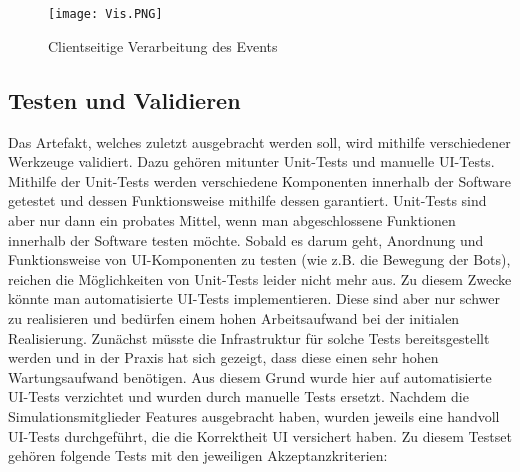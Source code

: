 \\\\  
\begin{figure}[h!]
	\centering
		\texttt{[image: Vis.PNG]}        
		\caption{Clientseitige Verarbeitung des Events}
	\label{addEventClient}
\end{figure} 
\newpage
\subsection{Testen und Validieren}
Das Artefakt, welches zuletzt ausgebracht werden soll, wird mithilfe verschiedener Werkzeuge validiert. Dazu gehören mitunter Unit-Tests und manuelle UI-Tests. Mithilfe der Unit-Tests werden verschiedene Komponenten innerhalb der Software getestet und dessen Funktionsweise mithilfe dessen garantiert. Unit-Tests sind aber nur dann ein probates Mittel, wenn man abgeschlossene Funktionen innerhalb der Software testen möchte. Sobald es darum geht, Anordnung und Funktionsweise von UI-Komponenten zu testen (wie z.B. die Bewegung der Bots), reichen die Möglichkeiten von Unit-Tests leider nicht mehr aus. Zu diesem Zwecke könnte man automatisierte UI-Tests implementieren. Diese sind aber nur schwer zu realisieren und bedürfen einem hohen Arbeitsaufwand bei der initialen Realisierung. Zunächst müsste die Infrastruktur für solche Tests bereitsgestellt werden und in der Praxis hat sich gezeigt, dass diese einen sehr hohen Wartungsaufwand benötigen. Aus diesem Grund wurde hier auf automatisierte UI-Tests verzichtet und wurden durch manuelle Tests ersetzt. Nachdem die Simulationsmitglieder Features ausgebracht haben, wurden jeweils eine handvoll UI-Tests durchgeführt, die die Korrektheit UI versichert haben. Zu diesem Testset gehören folgende Tests mit den jeweiligen Akzeptanzkriterien:

